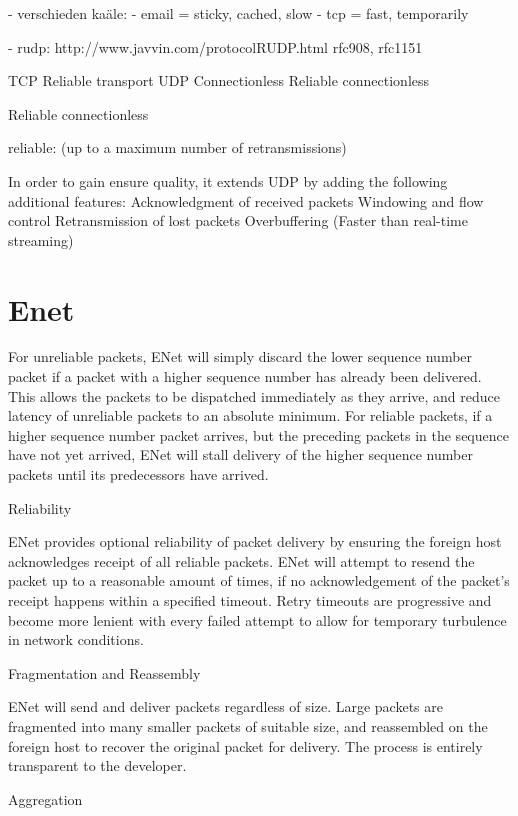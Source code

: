    - verschieden kaäle:
        - email = sticky, cached, slow
            - tcp = fast, temporarily

            - rudp:
                http://www.javvin.com/protocolRUDP.html
                        rfc908, rfc1151

TCP Reliable transport
UDP
Connectionless
Reliable connectionless\cite{rfc768}

Reliable connectionless\cite{rfc908,rfc1151}

reliable: (up to a maximum number of retransmissions)

In order to gain ensure quality, it extends UDP by adding the following additional features:
Acknowledgment of received packets
Windowing and flow control
Retransmission of lost packets
Overbuffering (Faster than real-time streaming)

\section{Enet}
For unreliable packets, ENet will simply discard the lower sequence number packet if a packet with a higher sequence number has already been delivered. This allows the packets to be dispatched immediately as they arrive, and reduce latency of unreliable packets to an absolute minimum. For reliable packets, if a higher sequence number packet arrives, but the preceding packets in the sequence have not yet arrived, ENet will stall delivery of the higher sequence number packets until its predecessors have arrived.


Reliability

ENet provides optional reliability of packet delivery by ensuring the foreign host acknowledges receipt of all reliable packets. ENet will attempt to resend the packet up to a reasonable amount of times, if no acknowledgement of the packet's receipt happens within a specified timeout. Retry timeouts are progressive and become more lenient with every failed attempt to allow for temporary turbulence in network conditions.

Fragmentation and Reassembly

ENet will send and deliver packets regardless of size. Large packets are fragmented into many smaller packets of suitable size, and reassembled on the foreign host to recover the original packet for delivery. The process is entirely transparent to the developer.

Aggregation

